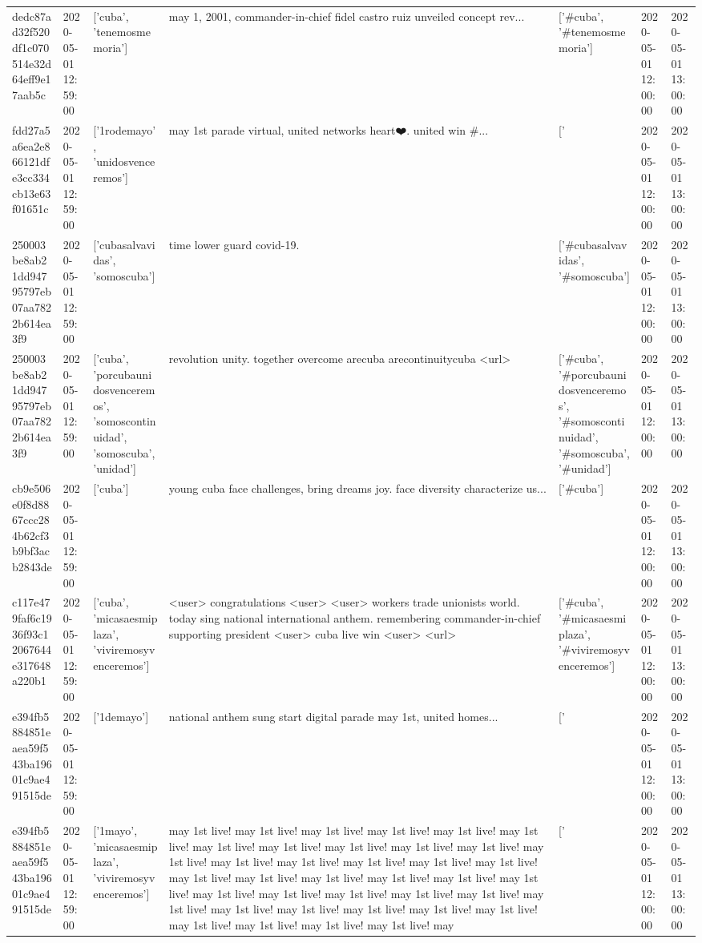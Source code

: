 \begin{tabular}{lllllll}
dedc87ad32f520df1c070514e32d64eff9e17aab5c & 2020-05-01 12:59:00 & ['cuba', 'tenemosmemoria'] & may 1, 2001, commander-in-chief fidel castro ruiz unveiled concept rev... & ['#cuba', '#tenemosmemoria'] & 2020-05-01 12:00:00 & 2020-05-01 13:00:00 \\
fdd27a5a6ea2e866121dfe3cc334cb13e63f01651c & 2020-05-01 12:59:00 & ['1rodemayo', 'unidosvenceremos'] & may 1st parade virtual, united networks heart❤️. united win \#... & ['#1rodemayo', '#unidosvenceremos'] & 2020-05-01 12:00:00 & 2020-05-01 13:00:00 \\
250003be8ab21dd94795797eb07aa7822b614ea3f9 & 2020-05-01 12:59:00 & ['cubasalvavidas', 'somoscuba'] & time lower guard covid-19. & ['#cubasalvavidas', '#somoscuba'] & 2020-05-01 12:00:00 & 2020-05-01 13:00:00 \\
250003be8ab21dd94795797eb07aa7822b614ea3f9 & 2020-05-01 12:59:00 & ['cuba', 'porcubaunidosvenceremos', 'somoscontinuidad', 'somoscuba', 'unidad'] & revolution unity. together overcome arecuba arecontinuitycuba <url> & ['#cuba', '#porcubaunidosvenceremos', '#somoscontinuidad', '#somoscuba', '#unidad'] & 2020-05-01 12:00:00 & 2020-05-01 13:00:00 \\
cb9e506e0f8d8867ccc284b62cf3b9bf3acb2843de & 2020-05-01 12:59:00 & ['cuba'] & young cuba face challenges, bring dreams joy. face diversity characterize us... & ['#cuba'] & 2020-05-01 12:00:00 & 2020-05-01 13:00:00 \\
c117e479faf6c1936f93c12067644e317648a220b1 & 2020-05-01 12:59:00 & ['cuba', 'micasaesmiplaza', 'viviremosyvenceremos'] & <user> congratulations <user> <user> workers trade unionists world. today sing national international anthem. remembering commander-in-chief supporting president <user> cuba live win <user> <url> & ['#cuba', '#micasaesmiplaza', '#viviremosyvenceremos'] & 2020-05-01 12:00:00 & 2020-05-01 13:00:00 \\
e394fb5884851eaea59f543ba19601c9ae491515de & 2020-05-01 12:59:00 & ['1demayo'] & national anthem sung start digital parade may 1st, united homes... & ['#1demayo'] & 2020-05-01 12:00:00 & 2020-05-01 13:00:00 \\
e394fb5884851eaea59f543ba19601c9ae491515de & 2020-05-01 12:59:00 & ['1mayo', 'micasaesmiplaza', 'viviremosyvenceremos'] & may 1st live! may 1st live! may 1st live! may 1st live! may 1st live! may 1st live! may 1st live! may 1st live! may 1st live! may 1st live! may 1st live! may 1st live! may 1st live! may 1st live! may 1st live! may 1st live! may 1st live! may 1st live! may 1st live! may 1st live! may 1st live! may 1st live! may 1st live! may 1st live! may 1st live! may 1st live! may 1st live! may 1st live! may 1st live! may 1st live! may 1st live! may 1st live! may 1st live! may 1st live! may 1st live! may 1st live! may 1st live! may 1st live! may & ['#1mayo', '#micasaesmiplaza', '#viviremosyvenceremos'] & 2020-05-01 12:00:00 & 2020-05-01 13:00:00 \\

\end{tabular}
